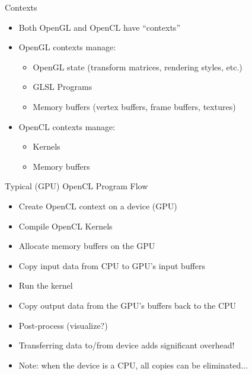 \begin{frame}{Contexts}
    \begin{itemize}
        \item Both OpenGL and OpenCL have ``contexts''
        \pause \item OpenGL contexts manage:
            \begin{itemize}
                \item OpenGL state (transform matrices, rendering styles, etc.)
                \pause \item GLSL Programs
                \pause \item Memory buffers (vertex buffers, frame buffers, textures)
            \end{itemize}
        \pause \item OpenCL contexts manage:
            \begin{itemize}
                \item Kernels
                \pause \item Memory buffers
            \end{itemize}
    \end{itemize}
\end{frame}

\begin{frame}{Typical (GPU) OpenCL Program Flow}
    \begin{itemize}
        \item Create OpenCL context on a device (GPU)
        \pause \item Compile OpenCL Kernels
        \pause \item Allocate memory buffers on the GPU
        \pause \item Copy input data from CPU to GPU's input buffers
        \pause \item Run the kernel
        \pause \item {\color{red} Copy output data from the GPU's buffers back to the CPU}
        \pause \item {\color{red} Post-process (visualize?)}
    \end{itemize}
    \begin{itemize}
        \pause \item Transferring data to/from device adds significant overhead!
        \item Note: when the device is a CPU, all copies can be eliminated...
    \end{itemize}
\end{frame}

